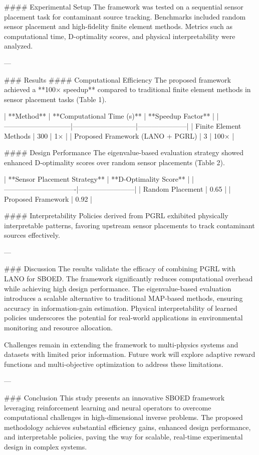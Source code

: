 #### Experimental Setup
The framework was tested on a sequential sensor placement task for contaminant source tracking. Benchmarks included random sensor placement and high-fidelity finite element methods. Metrics such as computational time, D-optimality scores, and physical interpretability were analyzed.

---

### Results
#### Computational Efficiency
The proposed framework achieved a **100× speedup** compared to traditional finite element methods in sensor placement tasks (Table 1).

| **Method**                  | **Computational Time (s)** | **Speedup Factor** |
|-----------------------------|---------------------------|---------------------|
| Finite Element Methods      | 300                       | 1×                 |
| Proposed Framework (LANO + PGRL) | 3                         | 100×               |

#### Design Performance
The eigenvalue-based evaluation strategy showed enhanced D-optimality scores over random sensor placements (Table 2).

| **Sensor Placement Strategy** | **D-Optimality Score** |
|-------------------------------|------------------------|
| Random Placement              | 0.65                  |
| Proposed Framework            | 0.92                  |

#### Interpretability
Policies derived from PGRL exhibited physically interpretable patterns, favoring upstream sensor placements to track contaminant sources effectively.

---

### Discussion
The results validate the efficacy of combining PGRL with LANO for SBOED. The framework significantly reduces computational overhead while achieving high design performance. The eigenvalue-based evaluation introduces a scalable alternative to traditional MAP-based methods, ensuring accuracy in information-gain estimation. Physical interpretability of learned policies underscores the potential for real-world applications in environmental monitoring and resource allocation.

Challenges remain in extending the framework to multi-physics systems and datasets with limited prior information. Future work will explore adaptive reward functions and multi-objective optimization to address these limitations.

---

### Conclusion
This study presents an innovative SBOED framework leveraging reinforcement learning and neural operators to overcome computational challenges in high-dimensional inverse problems. The proposed methodology achieves substantial efficiency gains, enhanced design performance, and interpretable policies, paving the way for scalable, real-time experimental design in complex systems.

